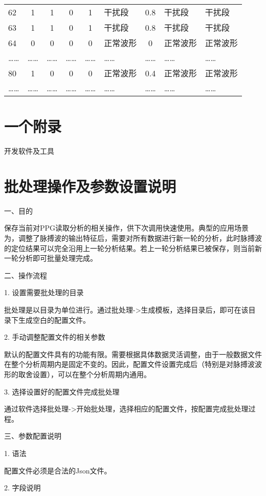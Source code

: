 {\begin{table}[htbp]
\begin{tabularx}{\linewidth}{X<{\centering}ccccX<{\centering}cX<{\centering}X<{\centering}}
    62    & 1     & 1     & 0     & 1     & 干扰段   & 0.8   & 干扰段 & 干扰段\\
    63    & 1     & 1     & 0     & 1     & 干扰段   & 0.8   & 干扰段 & 干扰段\\
    64    & 0     & 0     & 0     & 0     & 正常波形  & 0     & 正常波形 & 正常波形\\
    ……    & ……    & ……    & ……    & ……    & ……    & ……    & …… & ……\\
    80    & 1     & 0     & 0     & 0     & 正常波形  & 0.4   & 正常波形 & 正常波形\\
    ……    & ……    & ……    & ……    & ……    & ……    & ……    & …… & ……\\
    \bottomrule
    \end{tabularx}%
\end{table}%

\section{一个附录}
开发软件及工具

\section{批处理操作及参数设置说明}
一、目的

保存当前对PPG读取分析的相关操作，供下次调用快速使用。典型的应用场景为，调整了脉搏波的输出特征后，需要对所有数据进行新一轮的分析，此时脉搏波的定位结果可以完全沿用上一轮分析结果。若上一轮分析结果已被保存，则当前新一轮分析即可批量处理完成。

二、操作流程

1. 设置需要批处理的目录

批处理是以目录为单位进行。通过批处理->生成模板，选择目录后，即可在该目录下生成空白的配置文件。

2. 手动调整配置文件的相关参数

默认的配置文件具有的功能有限。需要根据具体数据灵活调整，由于一般数据文件在整个分析周期内是固定不变的。因此，配置文件设置完成后（特别是对脉搏波波形的取舍设置），可以在整个分析周期内通用。

3. 选择设置好的配置文件完成批处理

通过软件选择批处理->开始批处理，选择相应的配置文件，按配置完成批处理过程。

三、参数配置说明

1. 语法

配置文件必须是合法的Json文件。

2. 字段说明

}
